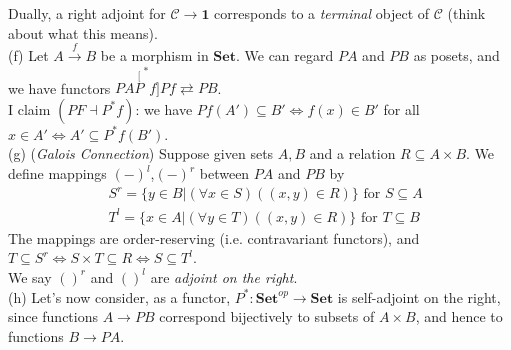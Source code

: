 \documentclass[a4paper]{article}
\begin{document}
\begin{eg}
    Dually, a right adjoint for $\mathcal{C} \to \mathbf{1}$ corresponds to a \emph{terminal} object of $\mathcal{C}$ (think about what this means).\\
    (f) Let $A \xrightarrow{f} B$ be a morphism in $\mathbf{Set}$. We can regard $PA$ and $PB$ as posets, and we have functors $PA \stackrel[P^*f]{Pf}{\rightleftarrows} PB$.\\
    I claim $(PF \dashv P^*f)$: we have $Pf(A') \subseteq B' \iff f(x) \in B'$ for all $x \in A' \iff A' \subseteq P^* f(B')$.\\
    (g) (\emph{Galois Connection}) Suppose given sets $A,B$ and a relation $R \subseteq A \times B$. We define mappings $(-)^l$,$(-)^r$ between $PA$ and $PB$ by 
    \begin{equation*}
        \begin{aligned}
            &S^r = \{y \in B| (\forall x \in S) ((x,y) \in R) \} \text{ for } S \subseteq A\\
            &T^l = \{x \in A | (\forall y \in T) ((x,y) \in R)\} \text{ for } T \subseteq B
        \end{aligned}
    \end{equation*}
    The mappings are order-reserving (i.e. contravariant functors), and $T \subseteq S^r \iff S \times T \subseteq R \iff S \subseteq T^l$.\\
    We say $()^r$ and $()^l$ are \emph{adjoint on the right}.\\
    (h) Let's now consider, as a functor, $P^* : \mathbf{Set}^{op} \to \mathbf{Set}$ is self-adjoint on the right, since functions $A \to PB$ correspond bijectively to subsets of $A \times B$, and hence to functions $B \to PA$.
\end{eg}
\end{document}
